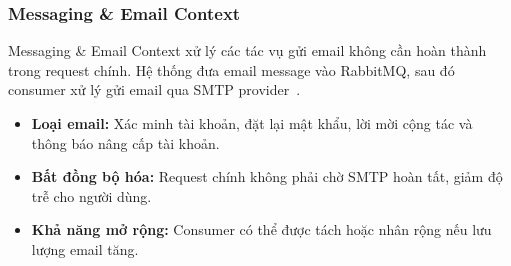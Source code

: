 \subsubsection{Messaging \& Email Context}
\label{subsubsec:messaging-email-context}

Messaging \& Email Context xử lý các tác vụ gửi email không cần hoàn thành trong request chính. Hệ thống đưa email message vào RabbitMQ, sau đó consumer xử lý gửi email qua SMTP provider~\cite{rabbitmqtutorials}.

\begin{itemize}
    \item \textbf{Loại email:} Xác minh tài khoản, đặt lại mật khẩu, lời mời cộng tác và thông báo nâng cấp tài khoản.
    \item \textbf{Bất đồng bộ hóa:} Request chính không phải chờ SMTP hoàn tất, giảm độ trễ cho người dùng.
    \item \textbf{Khả năng mở rộng:} Consumer có thể được tách hoặc nhân rộng nếu lưu lượng email tăng.
\end{itemize}